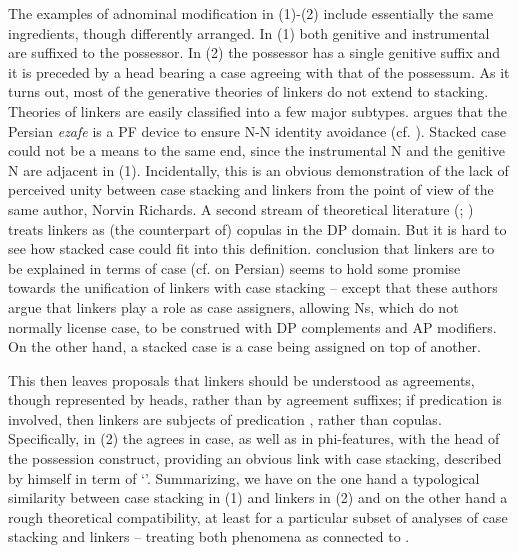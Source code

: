 \documentclass[output=paper]{langsci/langscibook}
\begin{document}
The examples of adnominal modification in (1)-(2) include essentially the same ingredients, though differently arranged. In (1) both genitive and instrumental are suffixed to the possessor. In (2) the possessor has a single genitive suffix and it is preceded by a head bearing a case agreeing with that of the possessum. As it turns out, most of the generative theories of linkers do not extend to stacking. Theories of linkers are easily classified into a few major subtypes. \citet{Richards2010} argues that the Persian \textit{ezafe} is a PF device to ensure N-N identity avoidance (cf. \citealt{Ghomeshi1997}). Stacked case could not be a means to the same end, since the instrumental N and the genitive N are adjacent in (1). Incidentally, this is an obvious demonstration of the lack of perceived unity between case stacking and linkers from the point of view of the same author, Norvin Richards. A second stream of theoretical literature (\citealt{Dikken2004}; \citealt{Campos2005}) treats linkers as (the counterpart of) copulas in the DP domain. But it is hard to see how stacked case could fit into this definition.  conclusion that linkers are to be explained in terms of case (cf. \citealt{Samiian1994} on Persian) seems to hold some promise towards the unification of linkers with case stacking – except that these authors argue that linkers play a role as case assigners, allowing Ns, which do not normally license case, to be construed with DP complements and AP modifiers. On the other hand, a stacked case is a case being assigned on top of another. 

This then leaves proposals \citep{Philip2012} that linkers should be understood as agreements, though represented by heads, rather than by agreement suffixes; if predication is involved, then linkers are subjects of predication \citep{Franco2015}, rather than copulas. Specifically, in  (2) the  agrees in case, as well as in phi-features, with the head of the possession construct, providing an obvious link with case stacking, described by \citet{Richards2013} himself in term of ‘’. Summarizing, we have on the one hand a typological similarity between case stacking in (1) and linkers in (2) and on the other hand a rough theoretical compatibility, at least for a particular subset of analyses of case stacking and linkers – treating both phenomena as connected to . 
\end{document}
